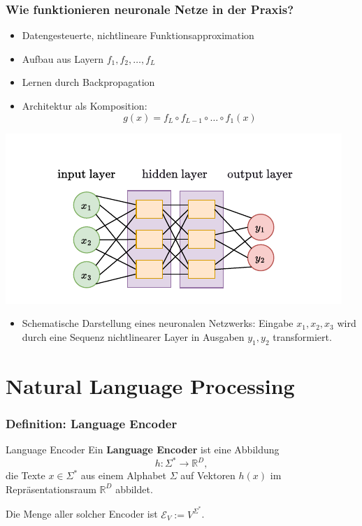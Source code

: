 \begingroup
\frametitle{Wie funktionieren neuronale Netze in der Praxis?}
\begin{frame}[plain]
\vfill
\begin{minipage}[c]{0.53\linewidth}
	\begin{itemize}
		\item Datengesteuerte, nichtlineare Funktionsapproximation
		\item Aufbau aus Layern \( f_1, f_2, \dots, f_L \)
		\item Lernen durch Backpropagation
		\item Architektur als Komposition:
	\[
	g(x) = f_L \circ f_{L-1} \circ \dots \circ f_1(x)
	\]
\end{itemize}
\end{minipage}
\hfill
\begin{minipage}[c]{0.44\linewidth}
	\includegraphics[width=0.95\linewidth]{BilderPräsentation/NN_ausgerichtet.drawio.pdf}
	\begin{itemize}\item []	{\scriptsize Schematische Darstellung eines neuronalen Netzwerks: Eingabe \(x_1, x_2, x_3\) wird durch eine Sequenz nichtlinearer Layer in Ausgaben \(y_1, y_2\) transformiert.} \end{itemize}

\end{minipage}
\vfill
\end{frame}
\endgroup

\section{Natural Language Processing}
\frame{\tableofcontents[currentsection]}

\begingroup
\frametitle{Definition: Language Encoder}

\begin{frame}
	\begin{block}{Language Encoder}
\small
Ein \textbf{Language Encoder} ist eine Abbildung
\[
h : \Sigma^* \rightarrow \mathbb{R}^D,
\]
die Texte \(x \in \Sigma^*\) aus einem Alphabet \(\Sigma\) auf Vektoren \(h(x)\) im Repräsentationsraum \(\mathbb{R}^D\) abbildet.

\vspace{0.3em}
Die Menge aller solcher Encoder ist \(\mathcal{E}_V := V^{\Sigma^*}\).

	\end{block}
\end{frame}

